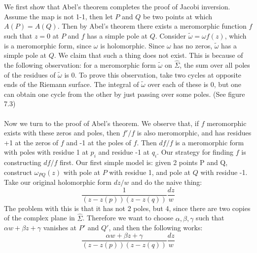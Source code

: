 \documentclass[12 pt]{article}
\theoremstyle{plain}
\theoremstyle{definition}
\theoremstyle{remark}
\begin{document}
\\
\\
We first show that Abel's theorem completes the proof of Jacobi inversion. Assume the map is not 1-1, then let $P$ and $Q$ be two points at which $A(P) = A(Q)$. Then by Abel's theorem there exists a meromorphic function $f$ such that $z=0$ at $P$ and $f$ has a simple pole at $Q$. Consider $\tilde \omega = \omega f(z)$, which is a meromorphic form, since $\omega$ is holomorphic. Since $\omega$ has no zeros, $\tilde \omega$ has a simple pole at $Q$. We claim that such a thing does not exist. This is because of the following observation: for a meromorphic form $\tilde \omega$ on $\hat \Sigma$, the sum over all poles of the residues of $\tilde \omega$ is 0. To prove this observation, take two cycles at opposite ends of the Riemann surface. The integral of $\tilde \omega$ over each of these is 0, but one can obtain one cycle from the other by just passing over some poles. (See figure 7.3)
\\
\\
Now we turn to the proof of Abel's theorem. We observe that, if $f$ meromorphic exists with these zeros and poles, then $f'/f$ is also meromorphic, and has residues +1 at the zeros of $f$ and -1 at the poles of $f$. Then $df/f$ is a meromorphic form with poles with residue 1 at $p_i$ and residue -1 at $q_i$. Our strategy for finding $f$ is constructing $df/f$ first. Our first simple model is: given 2 points P and Q, construct $\omega_{PQ}(z)$ with pole at $P$ with residue 1, and pole at $Q$ with residue -1. Take our original holomorphic form $dz/w$ and do the naive thing:
\[        \frac{1}{(z-z(p))(z-z(q))} \frac{dz}{w}     \]
The problem with this is that it has not 2 poles, but 4, since there are two copies of the complex plane in $\hat \Sigma$. Therefore we want to choose $\alpha, \beta, \gamma$ such that $\alpha w + \beta z + \gamma$ vanishes at $P'$ and $Q'$, and then the following works:
\[      \frac{\alpha w + \beta z + \gamma}{(z- z(p))(z-z(q))} \frac{dz}{w}       \]
\end{document}

